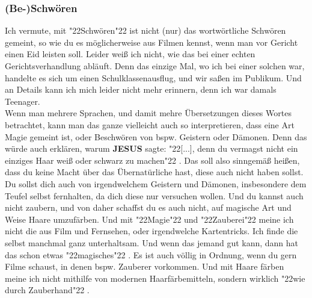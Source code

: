 \documentclass[10pt,a5paper]{article}
\newcommand{\Jesus}[0]{\textbf{JESUS}}
\newcommand{\q}[1]{\char"22{#1}\char"22 }
\begin{document}
	\subsubsection{(Be-)Schw\"oren}
		Ich vermute,
		mit \q{Schw\"oren} ist nicht (nur) das wortw\"ortliche Schw\"oren gemeint,
		so wie du es m\"oglicherweise aus Filmen kennst,
		wenn man vor Gericht einen Eid leisten soll.
		Leider wei{\ss} ich nicht,
		wie das bei einer echten Gerichtsverhandlung abl\"auft.
		Denn das einzige Mal,
		wo ich bei einer solchen war,
		handelte es sich um einen Schulklassenausflug,
		und wir sa{\ss}en im Publikum.
		Und an Details kann ich mich leider nicht mehr erinnern,
		denn ich war damals Teenager.
		\\
		Wenn man mehrere Sprachen,
		und damit mehre \"Ubersetzungen dieses Wortes betrachtet,
		kann man das ganze vielleicht auch so interpretieren,
		dass eine Art Magie gemeint ist,
		oder Beschw\"oren von bspw. Geistern oder D\"amonen.
		Denn das w\"urde auch erkl\"aren,
		warum {\Jesus} sagte:
		\q{[...],
		denn du vermagst nicht ein einziges Haar wei{\ss} oder schwarz zu machen}.
		Das soll also sinngem\"a{\ss} hei{\ss}en,
		dass du keine Macht \"uber das \"Ubernat\"urliche hast,
		diese auch nicht haben sollst.
		Du sollst dich auch von irgendwelchem Geistern und D\"amonen,
		insbesondere dem Teufel selbst fernhalten,
		da dich diese nur versuchen wollen.
		Und du kannst auch nicht zaubern,
		und von daher schaffst du es auch nicht,
		auf magische Art und Weise Haare umzuf\"arben.
		Und mit \q{Magie} und \q{Zauberei} meine ich nicht die aus Film und Fernsehen,
		oder irgendwelche Kartentricks.
		Ich finde die selbst manchmal ganz unterhaltsam.
		Und wenn das jemand gut kann,
		dann hat das schon etwas \q{magisches}.
		Es ist auch v\"ollig in Ordnung,
		wenn du gern Filme schaust,
		in denen bspw. Zauberer vorkommen.
		Und mit Haare f\"arben meine ich nicht mithilfe von modernen Haarf\"arbemitteln,
		sondern wirklich \q{wie durch Zauberhand}.
		
\end{document}
